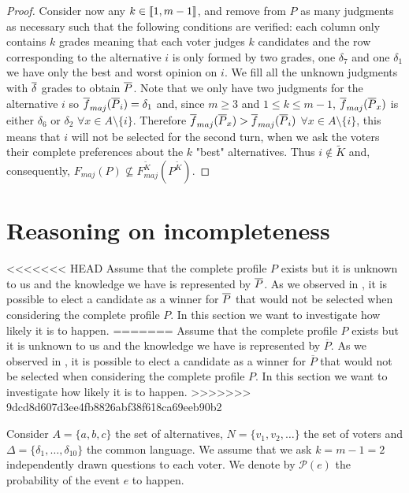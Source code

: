 \documentclass[version=3.21, pagesize, twoside=off, bibliography=totoc, DIV=calc, fontsize=12pt, a4paper]{scrartcl}
\begin{document}
\begin{proof}
	Consider now any $k \in \llbracket1,m-1\rrbracket$, and remove from $P$ as many judgments as necessary such that the following conditions are verified: each column only contains $k$ grades \textemdash meaning that each voter judges $k$ candidates \textemdash and the row corresponding to the alternative $i$ is only formed by two grades, one $\delta_7$ and one $\delta_1$ \textemdash we have only the best and worst opinion on $i$. We fill all the unknown judgments with $\overline{\delta}$ grades to obtain $\overline{P}$. Note that we only have two judgments for the alternative $i$ so $\overline{f}_{maj}(\overline{P}_i)=\delta_1$ and, since $m\geq3$ and $1 \leq k \leq m-1$, $\overline{f}_{maj}(\overline{P}_x)$ is either $\delta_6$ or $\delta_2$ $\forall x \in A \setminus \{i\}$. Therefore $\overline{f}_{maj}(\overline{P}_x) > \overline{f}_{maj}(\overline{P}_i)$ $\forall x \in A \setminus \{i\}$, this means that $i$ will not be selected for the second turn, when we ask the voters their complete preferences about the $k$ "best" alternatives. Thus $i \notin \tilde{K}$ and, consequently, $F_{maj}(P) \nsubseteq F^{\tilde{K}}_{maj}(P^{\tilde{K}})$.
\end{proof}


\section{Reasoning on incompleteness}

<<<<<<< HEAD
Assume that the complete profile $P$ exists but it is unknown to us and the knowledge we have is represented by $\overline{P}$. As we observed in , it is possible to elect a candidate as a winner for $\overline{P}$ that would not be selected when considering the complete profile $P$. In this section we want to investigate how likely it is to happen.
=======
Assume that the complete profile $P$ exists but it  is unknown to us and the knowledge we have is represented by $\overline{P}$. As we observed in , it is possible to elect a candidate as a winner for $\overline{P}$ that would not be selected when considering the complete profile $P$. In this section we want to investigate how likely it is to happen.
>>>>>>> 9dcd8d607d3ee4fb8826abf38f618ca69eeb90b2

Consider $A=\{a,b,c\}$ the set of alternatives, $N=\{v_1,v_2, \dots\}$ the set of voters and $\Delta=\{\delta_1, \dots, \delta_{10}\}$ the common language. We assume that we ask $k=m-1=2$ independently  drawn questions to each voter. We denote by $\mathcal{P}(e)$ the probability of the event $e$ to happen.
\end{document}
